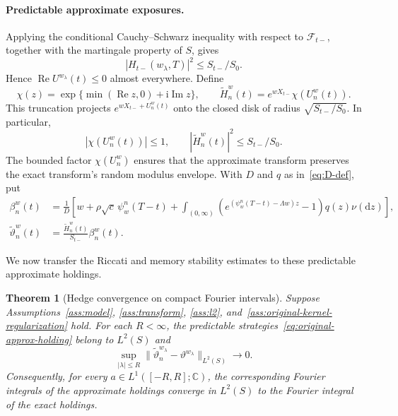 \documentclass[11pt]{article}
\newtheorem{theorem}{Theorem}[section]
\theoremstyle{definition}
\theoremstyle{remark}
\newcommand{\C}{\mathbb{C}}
\newcommand{\1}{\mathbf{1}}
\newcommand{\dd}{\mathrm{d}}
\begin{document}
\paragraph{Predictable approximate exposures.}
Applying the conditional Cauchy--Schwarz inequality with respect to
$\mathcal F_{t-}$, together with the martingale property of $S$, gives
\begin{equation}
\label{eq:original-transform-envelope}
 |H_{t-}(w_\lambda,T)|^2\leq S_{t-}/S_0.
\end{equation}
Hence $\operatorname{Re}U^{w_\lambda}(t)\leq0$ almost everywhere.
Define
\begin{equation}
\label{eq:original-clipped-transform}
 \chi(z)=\exp\{\min(\operatorname{Re}z,0)+\mathrm{i}\operatorname{Im}z\},
 \qquad
 \widetilde H_n^w(t)=e^{wX_{t-}}\chi(U_n^w(t)).
\end{equation}
This truncation projects $e^{wX_{t-}+U_n^w(t)}$ onto the closed disk
of radius $\sqrt{S_{t-}/S_0}$. In particular,
\begin{equation}
\label{eq:original-approx-envelope}
 |\chi(U_n^w(t))|\leq1,
 \qquad
 |\widetilde H_n^w(t)|^2\leq S_{t-}/S_0.
\end{equation}
The bounded factor $\chi(U_n^w)$ ensures that the approximate transform
preserves the exact transform's random modulus envelope.
With $D$ and $q$ as in~\eqref{eq:D-def}, put
\begin{align}
 \beta_n^w(t)&=\frac{1}{D}\left[
 w+\rho\sqrt c\,\psi_w^n(T-t)
 +\int_{(0,\infty)}\left(e^{(\psi_w^n(T-t)-\Lambda w)z}-1\right)q(z)\nu(\dd z)
 \right],\label{eq:original-approx-beta}\\
 \widetilde\vartheta_n^w(t)&=
 \frac{\widetilde H_n^w(t)}{S_{t-}}\beta_n^w(t).
 \label{eq:original-approx-holding}
\end{align}

We now transfer the Riccati and memory stability estimates to these
predictable approximate holdings.

\begin{theorem}[Hedge convergence on compact Fourier intervals]
\label{thm:original-compact-hedge}
Suppose Assumptions~\ref{ass:model}, \ref{ass:transform}, \ref{ass:l2},
and~\ref{ass:original-kernel-regularization} hold. For each $R<\infty$,
the predictable strategies~\eqref{eq:original-approx-holding} belong to
$L^2(S)$ and
\begin{equation}
\label{eq:original-compact-convergence}
 \sup_{|\lambda|\leq R}
 \|\widetilde\vartheta_n^{w_\lambda}
       -\vartheta^{w_\lambda}\|_{L^2(S)}\longrightarrow0.
\end{equation}
Consequently, for every $a\in L^1([-R,R];\C)$, the corresponding Fourier
integrals of the approximate holdings converge in $L^2(S)$ to the
Fourier integral of the exact holdings.
\end{theorem}
\end{document}
